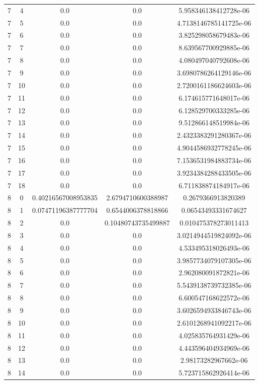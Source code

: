 \documentclass{article}
\begin{document}
\begin{table}[h]
\begin{tabular}{|c|c|c|c|c|}
7 & 4 & 0.0 & 0.0 & 5.958346138412728e-06 \\
7 & 5 & 0.0 & 0.0 & 4.7138146785141725e-06 \\
7 & 6 & 0.0 & 0.0 & 3.825298058679483e-06 \\
7 & 7 & 0.0 & 0.0 & 8.639567700929885e-06 \\
7 & 8 & 0.0 & 0.0 & 4.080497040792608e-06 \\
7 & 9 & 0.0 & 0.0 & 3.6980786264129146e-06 \\
7 & 10 & 0.0 & 0.0 & 2.7200161186624603e-06 \\
7 & 11 & 0.0 & 0.0 & 6.174615771648017e-06 \\
7 & 12 & 0.0 & 0.0 & 6.128529700333285e-06 \\
7 & 13 & 0.0 & 0.0 & 9.512866148519984e-06 \\
7 & 14 & 0.0 & 0.0 & 2.4323383291280367e-06 \\
7 & 15 & 0.0 & 0.0 & 4.9044586932778245e-06 \\
7 & 16 & 0.0 & 0.0 & 7.1536531984883734e-06 \\
7 & 17 & 0.0 & 0.0 & 3.9234384288433505e-06 \\
7 & 18 & 0.0 & 0.0 & 6.711838874184917e-06 \\
8 & 0 & 0.40216567008953835 & 2.6794710600388987 & 0.2679366913820389 \\
8 & 1 & 0.07471196387777704 & 0.6544006378818866 & 0.06543493331674627 \\
8 & 2 & 0.0 & 0.10480743735499887 & 0.010475378273011413 \\
8 & 3 & 0.0 & 0.0 & 3.0214944519824092e-06 \\
8 & 4 & 0.0 & 0.0 & 4.533495318026493e-06 \\
8 & 5 & 0.0 & 0.0 & 3.9857734079107305e-06 \\
8 & 6 & 0.0 & 0.0 & 2.962080091872821e-06 \\
8 & 7 & 0.0 & 0.0 & 5.5439138739732385e-06 \\
8 & 8 & 0.0 & 0.0 & 6.600547168622572e-06 \\
8 & 9 & 0.0 & 0.0 & 3.6026594933846743e-06 \\
8 & 10 & 0.0 & 0.0 & 2.6101268941092217e-06 \\
8 & 11 & 0.0 & 0.0 & 4.025835764931429e-06 \\
8 & 12 & 0.0 & 0.0 & 4.443596404934969e-06 \\
8 & 13 & 0.0 & 0.0 & 2.98173282967662e-06 \\
8 & 14 & 0.0 & 0.0 & 5.723715862926414e-06 \\

\end{tabular}
\end{table}
\end{document}
